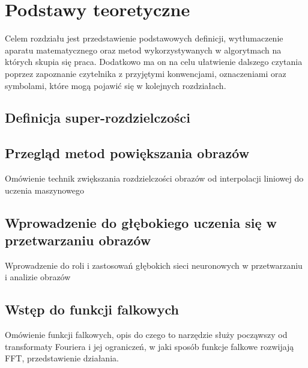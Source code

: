 \chapter{Podstawy teoretyczne}

Celem rozdziału jest przedstawienie podstawowych definicji, wytłumaczenie aparatu matematycznego oraz metod wykorzystywanych w algorytmach na których skupia się praca. Dodatkowo ma on na celu ułatwienie dalszego czytania poprzez zapoznanie czytelnika z przyjętymi konwencjami, oznaczeniami oraz symbolami, które mogą pojawić się w kolejnych rozdziałach. 


\section{Definicja super-rozdzielczości}




\section{Przegląd metod powiększania obrazów}


Omówienie technik zwiększania rozdzielczości obrazów od interpolacji liniowej do uczenia maszynowego


\section{Wprowadzenie do głębokiego uczenia się w przetwarzaniu obrazów}


Wprowadzenie do roli i zastosowań głębokich sieci neuronowych w przetwarzaniu i analizie obrazów


\section{Wstęp do funkcji falkowych}


Omówienie funkcji falkowych, opis do czego to narzędzie służy począwszy od transformaty Fouriera i jej ograniczeń, 
w jaki sposób funkcje falkowe rozwijają FFT, przedstawienie działania.

